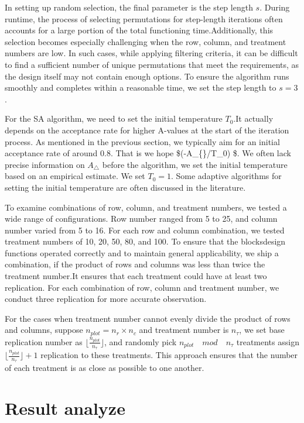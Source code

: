 \documentclass[
  a4paper,
  oneside,
  openany,
  12pt,
  onecolumn]{book}
\theoremstyle{plain}
\theoremstyle{definition}
\theoremstyle{remark}
\begin{document}
In setting up random selection, the final parameter is the step length
\(s\). During runtime, the process of selecting permutations for
step-length iterations often accounts for a large portion of the total
functioning time.Additionally, this selection becomes especially
challenging when the row, column, and treatment numbers are low. In such
cases, while applying filtering criteria, it can be difficult to find a
sufficient number of unique permutations that meet the requirements, as
the design itself may not contain enough options. To ensure the
algorithm runs smoothly and completes within a reasonable time, we set
the step length to \(s=3\).

For the SA algorithm, we need to set the initial temperature \(T_0\).It
actually depends on the acceptance rate for higher A-values at the start
of the iteration process. As mentioned in the previous section, we
typically aim for an initial acceptance rate of around 0.8. That is we
hope \$\exp(-A\_\{\bigtriangleup\}/T\_0)  \$. We often lack
precise information on \(A_{\bigtriangleup}\) before the algorithm, we
set the initial temperature based on an empirical estimate. We set
\(T_0=1\). Some adaptive algorithms for setting the initial temperature
are often discussed in the literature.

To examine combinations of row, column, and treatment numbers, we tested
a wide range of configurations. Row number ranged from 5 to 25, and
column number varied from 5 to 16. For each row and column combination,
we tested treatment numbers of 10, 20, 50, 80, and 100. To ensure that
the blocksdesign functions operated correctly and to maintain general
applicability, we ship a combination, if the product of rows and columns
was less than twice the treatment number.It ensures that each treatment
could have at least two replication. For each combination of row, column
and treatment number, we conduct three replication for more accurate
observation.

For the cases when treatment number cannot evenly divide the product of
rows and columns, suppose \(n_{plot}=n_r\times n_c\) and treatment
number is \(n_{\tau}\), we set base replication number as
\(\lfloor \frac{n_{plot}}{n_{\tau}} \rfloor\), and randomly pick
\(n_{plot}\quad mod\quad n_{\tau}\) treatments assign
\(\lfloor \frac{n_{plot}}{n_{\tau}} \rfloor+1\) replication to these
treatments. This approach ensures that the number of each treatment is
as close as possible to one another.

\section{Result analyze}\label{result-analyze}
\end{document}
